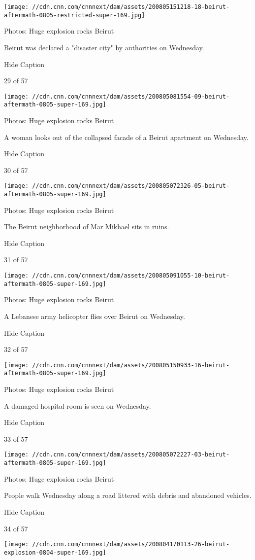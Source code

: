 \texttt{[image: //cdn.cnn.com/cnnnext/dam/assets/200805151218-18-beirut-aftermath-0805-restricted-super-169.jpg]}

Photos: Huge explosion rocks Beirut

Beirut was declared a "disaster city" by authorities on Wednesday.

Hide Caption

29 of 57

\texttt{[image: //cdn.cnn.com/cnnnext/dam/assets/200805081554-09-beirut-aftermath-0805-super-169.jpg]}

Photos: Huge explosion rocks Beirut

A woman looks out of the collapsed facade of a Beirut apartment on
Wednesday.

Hide Caption

30 of 57

\texttt{[image: //cdn.cnn.com/cnnnext/dam/assets/200805072326-05-beirut-aftermath-0805-super-169.jpg]}

Photos: Huge explosion rocks Beirut

The Beirut neighborhood of Mar Mikhael sits in ruins.

Hide Caption

31 of 57

\texttt{[image: //cdn.cnn.com/cnnnext/dam/assets/200805091055-10-beirut-aftermath-0805-super-169.jpg]}

Photos: Huge explosion rocks Beirut

A Lebanese army helicopter flies over Beirut on Wednesday.

Hide Caption

32 of 57

\texttt{[image: //cdn.cnn.com/cnnnext/dam/assets/200805150933-16-beirut-aftermath-0805-super-169.jpg]}

Photos: Huge explosion rocks Beirut

A damaged hospital room is seen on Wednesday.

Hide Caption

33 of 57

\texttt{[image: //cdn.cnn.com/cnnnext/dam/assets/200805072227-03-beirut-aftermath-0805-super-169.jpg]}

Photos: Huge explosion rocks Beirut

People walk Wednesday along a road littered with debris and abandoned
vehicles.

Hide Caption

34 of 57

\texttt{[image: //cdn.cnn.com/cnnnext/dam/assets/200804170113-26-beirut-explosion-0804-super-169.jpg]}

